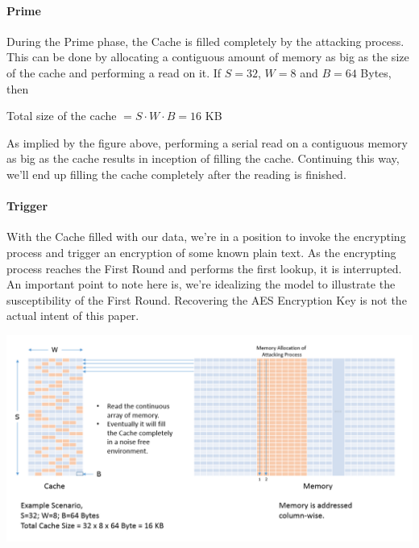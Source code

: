 \paragraph{Prime}
During the Prime phase, the Cache is filled completely by the attacking process. This can be done by allocating a contiguous amount of memory as big as the size of the cache and performing a read on it. If $S=32$, $W=8$ and $B=64$ Bytes, then

\begin{center}
Total size of the cache $=S\cdot W \cdot B=16$ KB
\end{center}

As implied by the figure above, performing a serial read on a contiguous memory as big as the cache results in inception of filling the cache. Continuing this way, we'll end up filling the cache completely after the reading is finished.

\paragraph{Trigger}
With the Cache filled with our data, we're in a position to invoke the encrypting process and trigger an encryption of some known plain text. As the encrypting process reaches the First Round and performs the first lookup, it is interrupted. An important point to note here is, we're idealizing the model to illustrate the susceptibility of the First Round. Recovering the AES Encryption Key is not the actual intent of this paper.

\begin{center}
\includegraphics[scale=0.4,natwidth=1159,natheight=589]{Figures/filling(new).png}
\label{fig: Demonstration of the Cache filling process.}
\end{center}


